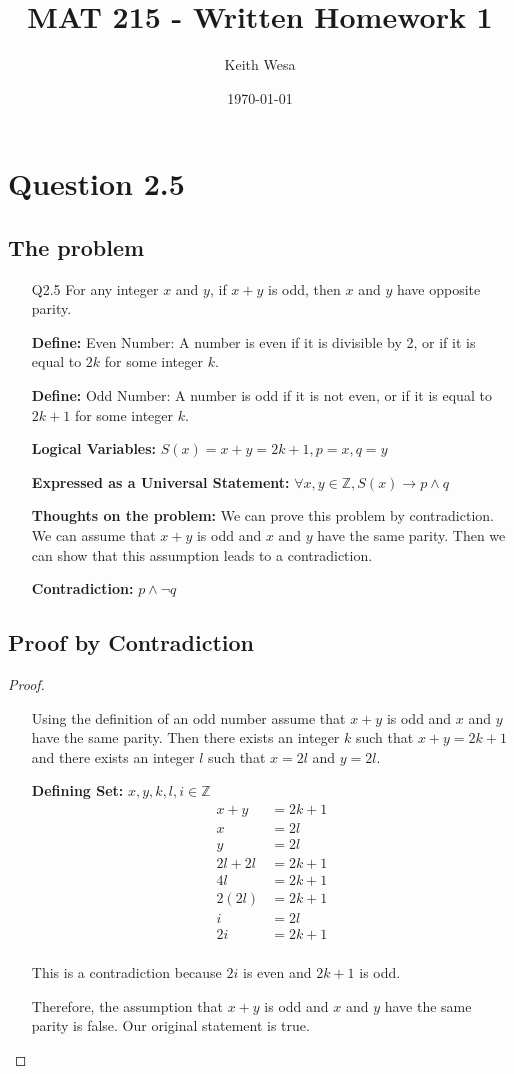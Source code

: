 \documentclass{article}
\author{Keith Wesa}
\title{MAT 215 - Written Homework 1}
\date{\today}
\begin{document}
\section*{Question 2.5}
\subsection*{The problem}
\begin{itemize}
    \item[Q2.5] For any integer $x$ and $y$, if $x+y$ is odd, then $x$ and $y$ have opposite parity.
    \item[] \textbf{Define: } Even Number: A number is even if it is divisible by 2, or if it is equal to $2k$ for some integer $k$.
    \item[] \textbf{Define: } Odd Number: A number is odd if it is not even, or if it is equal to $2k + 1$ for some integer $k$.
    \item[] \textbf{Logical Variables:} $ S(x)= x + y = 2k + 1, p = x, q = y$
    \item[] \textbf{Expressed as a Universal Statement:} $\forall x, y \in \mathbb{Z}, S(x) \rightarrow p \land q$
    \item[] \textbf{Thoughts on the problem: } We can prove this problem by contradiction. We can assume that $x + y$ is odd and $x$ and $y$ have the same parity. 
    Then we can show that this assumption leads to a contradiction.
    \item[] \textbf{Contradiction:} $p \land \lnot q$ 
\end{itemize}
\subsection*{Proof by Contradiction}
\begin{proof}
    
    \begin{itemize}
        \item[]Using the definition of an odd number assume that $x + y$ is odd and $x$ and $y$ have the same parity. Then there exists an integer $k$ such that $x + y = 2k + 1$ and there exists an integer $l$ such that $x = 2l$ and $y = 2l$.
        \item[] \textbf{Defining Set: }$x, y, k, l, i \in \mathbb{Z}$
        \begin{align*}
        x + y &= 2k + 1 \\
        x &= 2l \\
        y &= 2l \\
        2l + 2l &= 2k + 1 \\
        4l &= 2k + 1 \\
        2(2l) &= 2k + 1 \\
        i &= 2l \\
        2i &= 2k + 1 \\
        \end{align*}
        \item[] This is a contradiction because $2i$ is even and $2k + 1$ is odd.
        \item[] Therefore, the assumption that $x + y$ is odd and $x$ and $y$ have the same parity is false. Our original statement is true.
    \end{itemize}
\end{proof}
\end{document}

